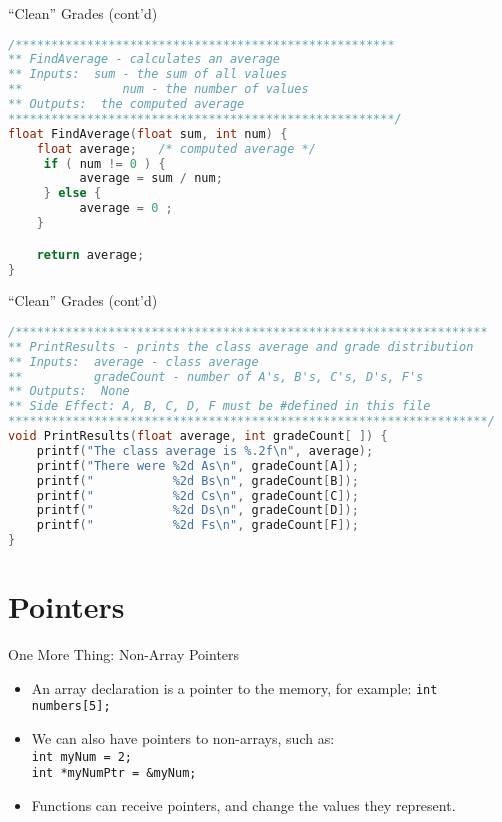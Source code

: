 \documentclass[graphics]{beamer}
\begin{document}
\begin{frame}[fragile]{``Clean'' Grades (cont'd)}
    \begin{lstlisting}[language=C,basicstyle=\scriptsize,keywordstyle=\color{blue},commentstyle=\color{green},showstringspaces=false,stringstyle=\color{red}]
/*****************************************************
** FindAverage - calculates an average
** Inputs:  sum - the sum of all values
**              num - the number of values
** Outputs:  the computed average
******************************************************/
float FindAverage(float sum, int num) {
    float average;   /* computed average */
     if ( num != 0 ) {
          average = sum / num;
     } else {
          average = 0 ;
    }

    return average;
}
    \end{lstlisting}
\end{frame}

\begin{frame}[fragile]{``Clean'' Grades (cont'd)}
    \begin{lstlisting}[language=C,basicstyle=\scriptsize,keywordstyle=\color{blue},commentstyle=\color{green},showstringspaces=false,stringstyle=\color{red}]
/******************************************************************
** PrintResults - prints the class average and grade distribution
** Inputs:  average - class average
**          gradeCount - number of A's, B's, C's, D's, F's
** Outputs:  None
** Side Effect: A, B, C, D, F must be #defined in this file
*******************************************************************/
void PrintResults(float average, int gradeCount[ ]) {
    printf("The class average is %.2f\n", average);
    printf("There were %2d As\n", gradeCount[A]);
    printf("           %2d Bs\n", gradeCount[B]);
    printf("           %2d Cs\n", gradeCount[C]);
    printf("           %2d Ds\n", gradeCount[D]);
    printf("           %2d Fs\n", gradeCount[F]);
}
    \end{lstlisting}
\end{frame}

\section*{Pointers}
\begin{frame}[fragile]{One More Thing: Non-Array Pointers}
    \begin{itemize}
        \item An array declaration is a pointer to the memory, for example: \texttt{int numbers[5];}
        \item We can also have pointers to non-arrays, such as: \\
        \texttt{int myNum = 2;}\\
        \texttt{int *myNumPtr = \&myNum;}
        \item Functions can receive pointers, and change the values they represent.
    \end{itemize}
\end{frame}
\end{document}

